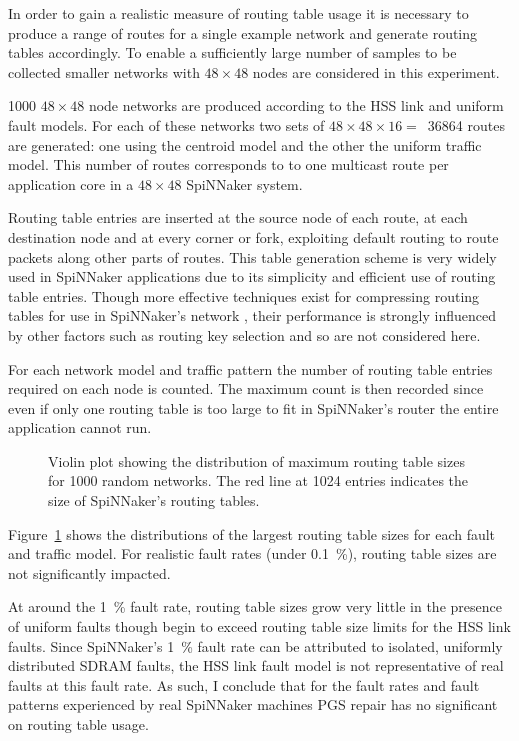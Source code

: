 			In order to gain a realistic measure of routing table usage it is
			necessary to produce a range of routes for a single example network and
			generate routing tables accordingly.  To enable a sufficiently large
			number of samples to be collected smaller networks with $48\times48$
			nodes are considered in this experiment.
			
			\num{1000} $48\times48$ node networks are produced according to the HSS
			link and uniform fault models. For each of these networks two sets of
			$48\times48\times16=$~\num{36864} routes are generated: one using the
			centroid model and the other the uniform traffic model. This number of
			routes corresponds to to one multicast route per application core in a
			$48\times48$ SpiNNaker system.
			
			Routing table entries are inserted at the source node of each route, at
			each destination node and at every corner or fork, exploiting default
			routing to route packets along other parts of routes. This table
			generation scheme is very widely used in SpiNNaker applications due to
			its simplicity and efficient use of routing table entries. Though more
			effective techniques exist for compressing routing tables for use in
			SpiNNaker's network \cite{mundy16}, their performance is strongly
			influenced by other factors such as routing key selection and so are not
			considered here.
			
			For each network model and traffic pattern the number of routing table
			entries required on each node is counted. The maximum count is then
			recorded since even if only one routing table is too large to fit in
			SpiNNaker's router the entire application cannot run.
			
			\begin{figure}
				\center
				
				\caption{Violin plot showing the distribution of maximum routing table
				sizes for \num{1000} random networks. The red line at \num{1024}
				entries indicates the size of SpiNNaker's routing tables.}
				\label{fig:routing-entries}
			\end{figure}
			
			Figure~\ref{fig:routing-entries} shows the distributions of the largest
			routing table sizes for each fault and traffic model. For realistic fault
			rates (under \SI{0.1}{\percent}), routing table sizes are not
			significantly impacted.
			
			At around the \SI{1}{\percent} fault rate, routing table sizes grow very
			little in the presence of uniform faults though begin to exceed routing
			table size limits for the HSS link faults. Since SpiNNaker's
			\SI{1}{\percent} fault rate can be attributed to isolated, uniformly
			distributed SDRAM faults, the HSS link fault model is not representative
			of real faults at this fault rate. As such, I conclude that for the fault
			rates and fault patterns experienced by real SpiNNaker machines PGS
			repair has no significant on routing table usage.
			
